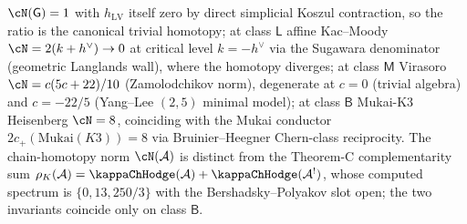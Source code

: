 \begin{proposition}
\begin{enumerate}[label=\textup{(\alph*)}]
$\cN(\mathsf G)=1$ with $h_{\mathrm{LV}}$ itself zero by direct
simplicial Koszul contraction, so the ratio is the canonical
trivial homotopy; at class $\mathsf L$ affine Kac--Moody
$\cN = 2(k+h^{\vee}) \to 0$ at critical level $k=-h^{\vee}$ via
the Sugawara denominator (geometric Langlands wall), where the
homotopy diverges; at class $\mathsf M$ Virasoro
$\cN = c(5c+22)/10$ (Zamolodchikov norm), degenerate at $c=0$
(trivial algebra) and $c=-22/5$ (Yang--Lee $(2,5)$ minimal
model); at class $\mathsf B$ Mukai-K3 Heisenberg $\cN = 8$,
coinciding with the Mukai conductor
$2c_{+}(\mathrm{Mukai}(K3))=8$ via Bruinier--Heegner Chern-class
reciprocity. The chain-homotopy norm $\cN(\cA)$ is distinct from
the Theorem-C complementarity sum
$\rho_K(\cA) = \kappaChHodge(\cA)+\kappaChHodge(\cA^!)$, whose
computed spectrum is $\{0, 13, 250/3\}$ with the
Bershadsky--Polyakov slot open; the two invariants coincide only
on class $\mathsf B$.
\end{enumerate}
\end{proposition}

